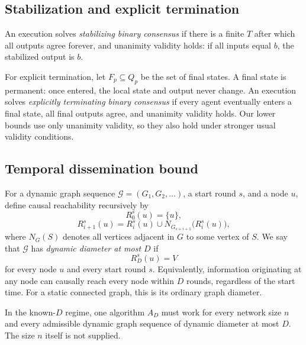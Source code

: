 \documentclass[11pt]{article}
\theoremstyle{remark}
\begin{document}
\subsection{Stabilization and explicit termination}
An execution solves \emph{stabilizing binary consensus} if there is a finite $T$ after which all outputs agree forever, and unanimity validity holds: if all inputs equal $b$, the stabilized output is $b$.

For explicit termination, let $F_p\subseteq Q_p$ be the set of final states. A final state is permanent: once entered, the local state and output never change. An execution solves \emph{explicitly terminating binary consensus} if every agent eventually enters a final state, all final outputs agree, and unanimity validity holds. Our lower bounds use only unanimity validity, so they also hold under stronger usual validity conditions.

\subsection{Temporal dissemination bound}
For a dynamic graph sequence $\mathcal G=(G_1,G_2,\ldots)$, a start round $s$, and a node $u$, define causal reachability recursively by
\[
R^{s}_0(u)=\{u\},
\]
\[
R^{s}_{i+1}(u)=R^{s}_i(u)\cup N_{G_{s+i+1}}\bigl(R^{s}_i(u)\bigr),
\]
where $N_G(S)$ denotes all vertices adjacent in $G$ to some vertex of $S$. We say that $\mathcal G$ has \emph{dynamic diameter at most $D$} if
\[
R^{s}_D(u)=V
\]
for every node $u$ and every start round $s$. Equivalently, information originating at any node can causally reach every node within $D$ rounds, regardless of the start time. For a static connected graph, this is its ordinary graph diameter.

In the known-$D$ regime, one algorithm $A_D$ must work for every network size $n$ and every admissible dynamic graph sequence of dynamic diameter at most $D$. The size $n$ itself is not supplied.
\end{document}
